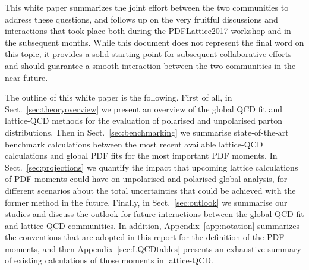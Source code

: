 This white paper summarizes the joint
effort between the two communities to address these questions, 
and follows up on the very fruitful discussions and interactions that took place both during 
the PDFLattice2017 workshop and in the subsequent months.
%
While this document does not represent the final word on this topic,
it provides a solid starting point for subsequent collaborative efforts
and should guarantee a smooth 
interaction between the two communities in the near future.

The outline of this white paper is the following.
%
First of all, in Sect.~\ref{sec:theoryoverview} we present an overview of
the global QCD fit and lattice-QCD methods for the evaluation
of polarised and unpolarised parton distributions.
%
Then in Sect.~\ref{sec:benchmarking}
we summarise state-of-the-art benchmark
calculations between the most
recent available lattice-QCD calculations and global PDF fits
for the most important PDF moments.
%
In Sect.~\ref{sec:projections} we quantify the impact that
upcoming lattice calculations of PDF moments could have on unpolarised
and polarised global analysis, for different scenarios
about the total uncertainties that could be achieved with the former
method in the future.
%
Finally, in Sect.~\ref{sec:outlook} we summarise our studies
and discuss the outlook for future interactions between
the global QCD fit and lattice-QCD communities.
%
In addition, Appendix~\ref{app:notation} summarizes the conventions
that are adopted in this report for the definition of the PDF
moments, and then
Appendix~\ref{sec:LQCDtables} presents an exhaustive summary of existing calculations
of those moments in lattice-QCD.
